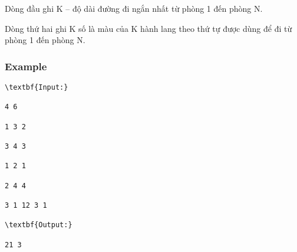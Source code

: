    Dòng đầu ghi K – độ dài đường đi ngắn nhất từ phòng 1 đến phòng N.   


   Dòng thứ hai ghi K số là màu của K hành lang theo thứ tự được dùng để đi từ phòng 1 đến phòng N.  

\subsubsection{   Example  }
\begin{verbatim}
\textbf{Input:}

4 6

1 3 2

3 4 3

1 2 1

2 4 4

3 1 12 3 1 

\textbf{Output:}

21 3\end{verbatim}
